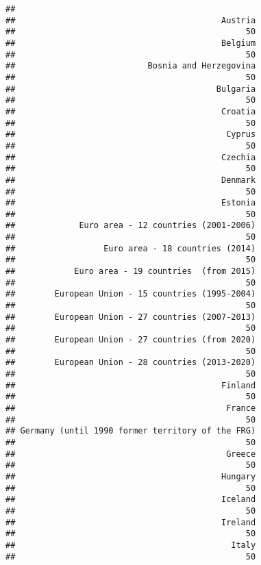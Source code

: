 \documentclass[]{article}
\begin{document}
\begin{verbatim}
## 
##                                          Austria 
##                                               50 
##                                          Belgium 
##                                               50 
##                           Bosnia and Herzegovina 
##                                               50 
##                                         Bulgaria 
##                                               50 
##                                          Croatia 
##                                               50 
##                                           Cyprus 
##                                               50 
##                                          Czechia 
##                                               50 
##                                          Denmark 
##                                               50 
##                                          Estonia 
##                                               50 
##             Euro area - 12 countries (2001-2006) 
##                                               50 
##                  Euro area - 18 countries (2014) 
##                                               50 
##            Euro area - 19 countries  (from 2015) 
##                                               50 
##        European Union - 15 countries (1995-2004) 
##                                               50 
##        European Union - 27 countries (2007-2013) 
##                                               50 
##        European Union - 27 countries (from 2020) 
##                                               50 
##        European Union - 28 countries (2013-2020) 
##                                               50 
##                                          Finland 
##                                               50 
##                                           France 
##                                               50 
## Germany (until 1990 former territory of the FRG) 
##                                               50 
##                                           Greece 
##                                               50 
##                                          Hungary 
##                                               50 
##                                          Iceland 
##                                               50 
##                                          Ireland 
##                                               50 
##                                            Italy 
##                                               50 

\end{verbatim}
\end{document}
